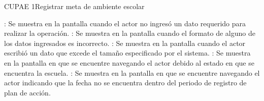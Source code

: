 \begin{UseCase}{CUPAE 1}{Registrar meta de ambiente escolar}
{\begin{UClist}
			\UCli {}: Se muestra en la pantalla  cuando el actor no ingresó un dato requerido para realizar la operación.
			\UCli {}: Se muestra en la pantalla  cuando el formato de alguno de los datos ingresados es incorrecto.
 			\UCli {}: Se muestra en la pantalla  cuando el actor escribió un dato que excede el tamaño especificado por el sistema.
\UCli {}: Se muestra en la pantalla en que se encuentre navegando el actor debido al estado en que se encuentra la escuela.
\UCli {}: Se muestra en la pantalla en que se encuentre navegando el actor indicando que la fecha no se encuentra dentro del periodo de registro de plan de acción. 			
		\end{UClist}
	}


\end{UseCase}
 
